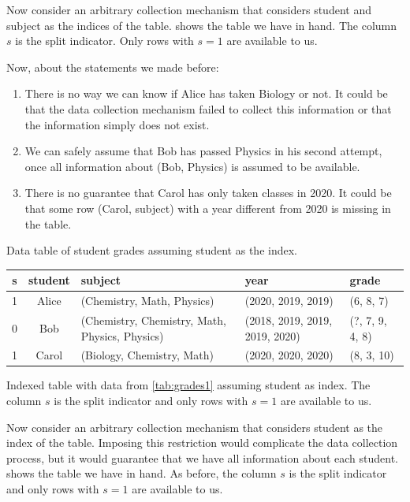 Now consider an arbitrary collection mechanism that considers student and subject as the
indices of the table.   shows the table we have in hand.  The column $s$
is the split indicator.  Only rows with $s = 1$ are available to us.

Now, about the statements we made before:
\begin{enumerate}
  \itemsep0em
  \item There is no way we can know if Alice has taken Biology or not.  It could be that
    the data collection mechanism failed to collect this information or that the
    information simply does not exist.
  \item We can safely assume that Bob has passed Physics in his second attempt, once all
    information about (Bob, Physics) is assumed to be available.
  \item There is no guarantee that Carol has only taken classes in 2020.  It could be that
    some row (Carol, subject) with a year different from 2020 is missing in the table.
\end{enumerate}

\begin{tablebox}[label=tab:grades3]{Data table of student grades assuming student as the index.}
  \centering
  \begin{tabular}{cc|p{2.6cm}p{1.8cm}>{\raggedright\arraybackslash}p{1.2cm}}
    \toprule
    \textbf{s} & \textbf{student} & \textbf{subject} & \textbf{year} & \textbf{grade} \\
    \midrule
    1 & Alice & (Chemistry, Math, Physics) & (2020, 2019, 2019) & (6, 8, 7) \\
    0 & Bob & (Chemistry, Chemistry, Math, Physics, Physics) & (2018, 2019, 2019, 2019, 2020) & (?, 7, 9, 4, 8) \\
    1 & Carol & (Biology, Chemistry, Math) & (2020, 2020, 2020) & (8, 3, 10) \\
    \bottomrule
  \end{tabular}
  \tcblower
  Indexed table with data from \cref{tab:grades1} assuming student
  as index.  The column $s$ is the split indicator and only rows with $s = 1$ are available to us.
\end{tablebox}

Now consider an arbitrary collection mechanism that considers student as the index of the table.
Imposing this restriction would complicate the data collection process, but it would
guarantee that we have all information about each student.   shows the
table we have in hand.  As before, the column $s$ is the split indicator and only rows with
$s = 1$ are available to us.

